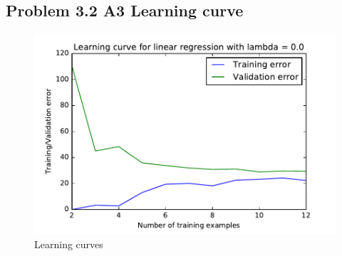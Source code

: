 \documentclass[pdftex,11pt]{article}
\begin{document}
\subsection{Problem 3.2 A3 Learning curve}

\begin{figure}[H]
  \caption{Learning curves}
  \centering
    \includegraphics[scale=1]{fig8.pdf}
\end{figure}
\end{document}
